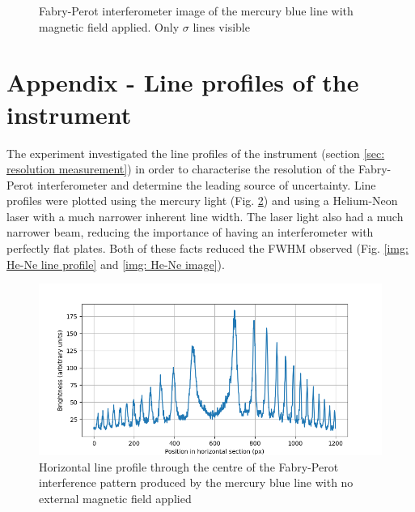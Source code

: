 \documentclass[11pt]{article}
\begin{document}
\begin{figure}[h!]
\begin{minipage}[t]{0.47\linewidth}
        \captionsetup{justification=centering}
        \caption{Fabry-Perot interferometer image of the mercury blue line with magnetic field applied. Only $\sigma$ lines visible}
        \label{img: Hg blue sigma}
    \end{minipage}
\end{figure}

\newpage

\section{Appendix - Line profiles of the instrument} \label{sec: Line profiles}
The experiment investigated the line profiles of the instrument (section \ref{sec: resolution measurement}) in order to characterise the resolution of the Fabry-Perot interferometer and determine the leading source of uncertainty. Line profiles were plotted using the mercury light (Fig. \ref{img: Hg line profile}) and using a Helium-Neon laser with a much narrower inherent line width. The laser light also had a much narrower beam, reducing the importance of having an interferometer with perfectly flat plates. Both of these facts reduced the FWHM observed (Fig. \ref{img: He-Ne line profile} and \ref{img: He-Ne image}).
\begin{figure}[h!]
    \centering
    \includegraphics[width=\linewidth]{line profiles/Hg line profile no field 2.png}
    \captionsetup{justification=centering}
    \caption{Horizontal line profile through the centre of the Fabry-Perot interference pattern produced by the mercury blue line with no external magnetic field applied}
    \label{img: Hg line profile}
\end{figure}
\end{document}
